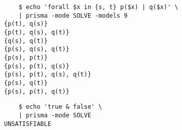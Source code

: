 \documentclass{llncs}
\begin{document}
\begin{enumerate}
\begin{verbatim}
	$ echo 'forall $x in {s, t} p($x) | q($x)' \
	| prisma -mode SOLVE -models 9
{p(t), q(s)}
{p(t), q(s), q(t)}
{q(s), q(t)}
{p(s), q(s), q(t)}
{p(s), p(t)}
{p(s), p(t), q(s)}
{p(s), p(t), q(s), q(t)}
{p(s), q(t)}
{p(s), p(t), q(t)}
\end{verbatim}

\begin{verbatim}
	$ echo 'true & false' \
	| prisma -mode SOLVE
UNSATISFIABLE
\end{verbatim}

\end{enumerate}
\end{document}
